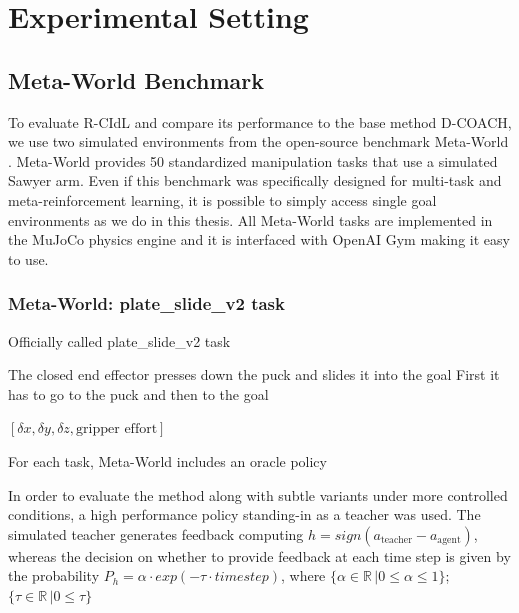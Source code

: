 \chapter{Experimental Setting}
\label{chapter:Experimental Setting}


\section{Meta-World Benchmark}
\label{section:Meta-World Benchmark}
To evaluate R-CIdL and compare its performance to the base method D-COACH, we use two simulated environments from the open-source benchmark Meta-World \cite{metaworld}. Meta-World 
provides 50 standardized manipulation tasks that use a simulated Sawyer arm. Even if this benchmark was specifically designed for multi-task and meta-reinforcement learning, it is possible to simply access single goal environments as we do in this thesis. All Meta-World tasks are implemented in the MuJoCo physics engine \cite{mujoco} and it is interfaced with OpenAI Gym \cite{openai} making it easy to use. 

\subsection{Meta-World: plate\_slide\_v2 task}
\label{subsection:metaworld-hockey-task}
Officially called plate\_slide\_v2 task

The closed end effector presses down the puck and slides it into the goal
First it has to go to the puck and then to the goal


$[\delta x, \delta y, \delta z, \text{gripper effort}]$

For each task, Meta-World includes an oracle policy

In order to evaluate the method along with subtle variants under more controlled conditions, a high performance policy standing-in as a teacher was used. The simulated teacher generates feedback computing $h = sign(a_\text{teacher} - a_\text{agent})$, whereas the decision on whether to provide feedback at each time step is given by the probability $P_h = \alpha \cdot exp(-\tau \cdot timestep)$, where $\{\alpha \in \mathbb{R}\, | 0 \leq \alpha \leq 1 \}$; $\{\tau \in \mathbb{R} \, | 0 \leq \tau\}$

 

